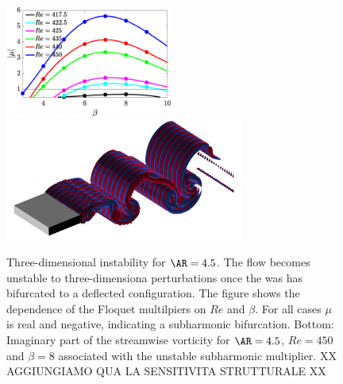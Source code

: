 \begin{figure}
  \centering
  \includegraphics[width=0.49\textwidth]{./fig/AR4p5/multipliers_3D.eps}
  \includegraphics[trim={0 0 0 0},clip,width=0.7\textwidth]{./fig/AR4p5/Floqetmode_beta_8_Re450_AR4p5.png}  
  \caption{Three-dimensional instability for $\AR=4.5$. The flow becomes unstable to three-dimensiona perturbations once the was has bifurcated to a deflected configuration. The figure shows the dependence of the Floquet multilpiers on $Re$ and $\beta$. For all cases $\mu$ is real and negative, indicating a subharmonic bifurcation. Bottom: Imaginary part of the streamwise vorticity for $\AR=4.5$, $Re=450$ and $\beta=8$ associated with the unstable subharmonic multiplier. XX AGGIUNGIAMO QUA LA SENSITIVITA STRUTTURALE XX}
  \label{fig:mul-3d-ar4p5}
\end{figure}

